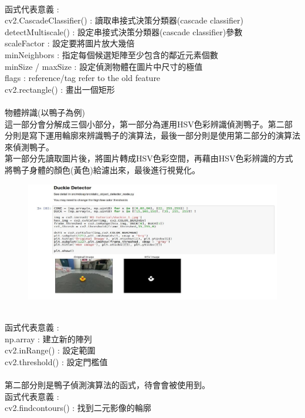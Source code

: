 \documentclass{article}
\begin{document}
\\
函式代表意義 : 
\\cv2.CascadeClassifier()	: 讀取串接式決策分類器(cascade classifier)
\\detectMultiscale()		: 設定串接式決策分類器(cascade classifier)參數
\\scaleFactor			: 設定要將圖片放大幾倍
\\minNeighbors			: 指定每個候選矩陣至少包含的鄰近元素個數
\\minSize / maxSize	 	: 設定偵測物體在圖片中尺寸的極值
\\flags				: reference/tag refer to the old feature
\\cv2.rectangle()		: 畫出一個矩形
\\\\物體辨識(以鴨子為例)
\\這一部分會分解成三個小部分，第一部分為運用HSV色彩辨識偵測鴨子。第二部分則是寫下運用輪廓來辨識鴨子的演算法，最後一部分則是使用第二部分的演算法來偵測鴨子。
\\第一部分先讀取圖片後，將圖片轉成HSV色彩空間，再藉由HSV色彩辨識的方式將鴨子身體的顏色(黃色)給濾出來，最後進行視覺化。
\begin{figure}[htp]
    \begin{center}
        \includegraphics[width=400pt]{pic/5_1_5.png}
    \end{center}
\end{figure}
\\
函式代表意義 : 
\\np.array			: 建立新的陣列
\\cv2.inRange()		: 設定範圍
\\cv2.threshold()		: 設定門檻值
\\\\第二部分則是鴨子偵測演算法的函式，待會會被使用到。
\\函式代表意義 : 
\\cv2.findcontours()			: 找到二元影像的輪廓
\end{document}

